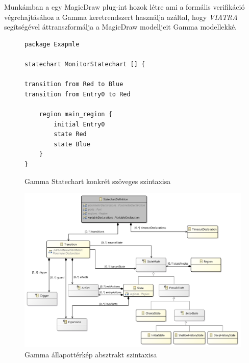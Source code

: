 Munkámban a egy MagicDraw plug-int hozok létre ami a formális verifikáció végrehajtásához a Gamma keretrendszert használja azáltal, hogy \emph{VIATRA} segítségével áttranszformálja a MagicDraw modelljeit Gamma modellekké.

\begin{figure}[!ht]
\begin{lstlisting}
package Exapmle

statechart MonitorStatechart [] {

transition from Red to Blue
transition from Entry0 to Red

	region main_region {
		initial Entry0
		state Red
		state Blue
	}
}
\end{lstlisting}
\caption{Gamma Statechart konkrét szöveges szintaxisa}
\label{fig:gamma-syntax}
\end{figure}


\begin{figure}[!ht]
	\centering
	\includegraphics[keepaspectratio, width=150mm]{figures/statechart_class_diagram.png}
	\caption{Gamma állapottérkép absztrakt szintaxisa}
	\label{fig:gamma_statechart_model}
\end{figure}



